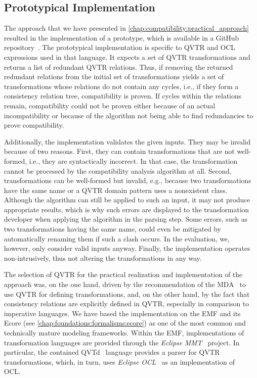 \subsection{Prototypical Implementation}
\label{chap:correctness_evaluation:compatibility:implementation}

The approach that we have presented in \autoref{chap:compatibility:practical_approach} resulted in the implementation of a prototype, which is available in a GitHub repository~\cite{decompositionGithub}.
The prototypical implementation is specific to \gls{QVTR} and \gls{OCL} expressions used in that language.
It expects a set of \gls{QVTR} transformations and returns a list of redundant \gls{QVTR} relations.
Thus, if removing the returned redundant relations from the initial set of transformations yields a set of transformations whose relations do not contain any cycles, i.e., if they form a consistency relation tree, compatibility is proven.
If cycles within the relations remain, compatibility could not be proven either because of an actual incompatibility or because of the algorithm not being able to find redundancies to prove compatibility.

Additionally, the implementation validates the given inputs.
They may be invalid because of two reasons.
First, they can contain transformations that are not well-formed, i.e., they are syntactically incorrect. In that case, the transformation cannot be processed by the compatibility analysis algorithm at all.
Second, transformations can be well-formed but invalid, e.g., because two transformations have the same name or a \gls{QVTR} domain pattern uses a nonexistent class.
Although the algorithm can still be applied to such an input, it may not produce appropriate results, which is why such errors are displayed to the transformation developer when applying the algorithm in the parsing step.
Some errors, such as two transformations having the same name, could even be mitigated by automatically renaming them if such a clash occurs.
In the evaluation, we, however, only consider valid inputs anyway.
Finally, the implementation operates non-intrusively, thus not altering the transformations in any way.

The selection of \gls{QVTR} for the practical realization and implementation of the approach was, on the one hand, driven by the recommendation of the \gls{MDA}~\cite{mda} to use \gls{QVTR} for defining transformations, and, on the other hand, by the fact that consistency relations are explicitly defined in \gls{QVTR}, especially in comparison to imperative languages.
We have based the implementation on the \gls{EMF} and its Ecore \metametamodel (see \autoref{chap:foundations:formalisms:ecore}) as one of the most common and technically mature modeling frameworks.
Within the \gls{EMF}, implementations of transformation languages are provided through the \emph{Eclipse MMT}~\cite{EclipseMMT} project.
In particular, the contained \gls{QVTd}~\cite{EclipseQVTd} language provides a parser for \gls{QVTR} transformations, which, in turn, uses \emph{Eclipse OCL}~\cite{EclipseOCL} as an implementation of \gls{OCL}.


